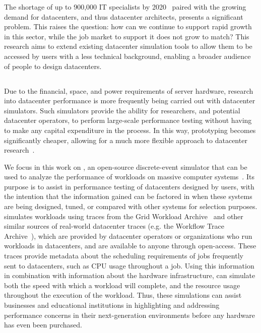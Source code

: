 \documentclass[11pt]{article}
\begin{document}
	The shortage of up to 900,000 IT specialists by 2020~\cite{Gareis2014} paired with the growing demand for datacenters, and thus datacenter architects, presents a significant problem.
	This raises the question: how can we continue to support rapid growth in this sector, while the job market to support it does not grow to match?
	This research aims to extend existing datacenter simulation tools to allow them to be accessed by users with a less technical background, enabling a broader audience of people to design datacenters.

	\subsection{\opendc{}}
		Due to the financial, space, and power requirements of server hardware, research into datacenter performance is more frequently being carried out with datacenter simulators.
		Such simulators provide the ability for researchers, and potential datacenter operators, to perform large-scale performance testing without having to make any capital expenditure in the process.
		In this way, prototyping becomes significantly cheaper, allowing for a much more flexible approach to datacenter research~\cite{Iosup2017}.

		We focus in this work on \opendc{}, an open-source discrete-event simulator that can be used to analyze the performance of workloads on massive computer systems~\cite{Iosup2017}. 
		Its purpose is to assist in performance testing of datacenters designed by users, with the intention that the information gained can be factored in when these systems are being designed, tuned, or compared with other systems for selection purposes. 
		\opendc{} simulates workloads using traces from the Grid Workload Archive~\cite{Iosup2008} and other similar sources of real-world datacenter traces (e.g. the Workflow Trace Archive~\cite{Versluis2020}), which are provided by datacenter operators or organizations who run workloads in datacenters, and are available to anyone through open-access. 
		These traces provide metadata about the scheduling requirements of jobs frequently sent to datacenters, such as CPU usage throughout a job. 
		Using this information in combination with information about the hardware infrastructure, \opendc{} can simulate both the speed with which a workload will complete, and the resource usage throughout the execution of the workload. 
		Thus, these simulations can assist businesses and educational institutions in highlighting and addressing performance concerns in their next-generation environments before any hardware has even been purchased.
\end{document}
